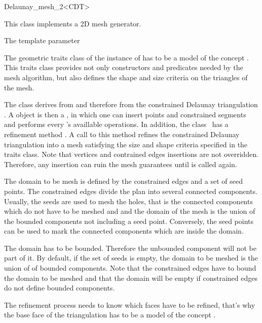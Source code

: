 \begin{ccRefClass}{Delaunay_mesh_2<CDT>}

This class implements a 2D mesh generator.

\ccParameters
The template parameter  \meshcdtrequires{}

The geometric traits class of the instance of  has to be
  a model of the concept . This traits class
  provides not only constructors and predicates needed by the mesh
  algorithm, but also defines the shape and size criteria on the
  triangles of the mesh.


The class \ccRefName{} derives from
   and therefore from
  the constrained Delaunay triangulation . A \ccRefName{}
  object is then a , in which one can insert points and
  constrained segments and performs every 's availlable
  operations. In addition, the class \ccRefName\ has a refinement
  method . A call to this method refines the
  constrained Delaunay triangulation into a mesh satisfying the size
  and shape criteria specified in the traits class. Note that vertices
  and contrained edges insertions are not overridden. Therefore, any
  insertion can ruin the mesh guarantees until  is
  called again.
  
  The domain to be mesh is defined by the constrained edges and a set
  of seed points. The constrained edges divide the plan into several
  connected components. Usually, the seeds are used to mesh the holes,
  that is the connected components which do not have to be meshed and
  and the domain of the mesh is the union of the bounded components
  not including a seed point. Conversely, the seed points can be used
  to mark the connected components which are inside the domain.
  
  The domain has to be bounded. Therefore the unbounded component will
  not be part of it. By
  default, if the set of seeds is empty, the domain to be meshed is
  the union of of bounded components. Note that the constrained edges
  have to bound the domain to be meshed and that the domain will be
  empty if constrained edges do not define bounded components.

The refinement process needs to know which faces have to be
  refined, that's why the base face of the triangulation  has
  to be a model of the concept .


\end{ccRefClass}
